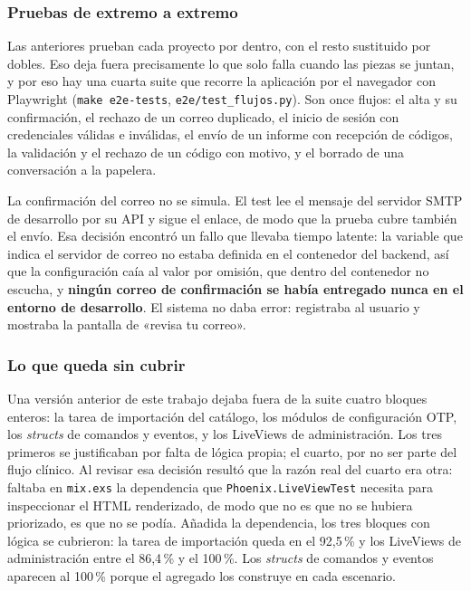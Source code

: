 \subsubsection*{Pruebas de extremo a extremo}

Las anteriores prueban cada proyecto por dentro, con el resto sustituido por dobles. Eso deja fuera precisamente lo que solo falla cuando las piezas se juntan, y por eso hay una cuarta suite que recorre la aplicación por el navegador con Playwright (\texttt{make e2e-tests}, \texttt{e2e/test\_flujos.py}). Son once flujos: el alta y su confirmación, el rechazo de un correo duplicado, el inicio de sesión con credenciales válidas e inválidas, el envío de un informe con recepción de códigos, la validación y el rechazo de un código con motivo, y el borrado de una conversación a la papelera.

La confirmación del correo no se simula. El test lee el mensaje del servidor SMTP de desarrollo por su API y sigue el enlace, de modo que la prueba cubre también el envío. Esa decisión encontró un fallo que llevaba tiempo latente: la variable que indica el servidor de correo no estaba definida en el contenedor del backend, así que la configuración caía al valor por omisión, que dentro del contenedor no escucha, y \textbf{ningún correo de confirmación se había entregado nunca en el entorno de desarrollo}. El sistema no daba error: registraba al usuario y mostraba la pantalla de «revisa tu correo».

\subsubsection*{Lo que queda sin cubrir}

Una versión anterior de este trabajo dejaba fuera de la suite cuatro bloques enteros: la tarea de importación del catálogo, los módulos de configuración OTP, los \emph{structs} de comandos y eventos, y los LiveViews de administración. Los tres primeros se justificaban por falta de lógica propia; el cuarto, por no ser parte del flujo clínico. Al revisar esa decisión resultó que la razón real del cuarto era otra: faltaba en \texttt{mix.exs} la dependencia que \texttt{Phoenix.LiveViewTest} necesita para inspeccionar el HTML renderizado, de modo que no es que no se hubiera priorizado, es que no se podía. Añadida la dependencia, los tres bloques con lógica se cubrieron: la tarea de importación queda en el 92,5\,\% y los LiveViews de administración entre el 86,4\,\% y el 100\,\%. Los \emph{structs} de comandos y eventos aparecen al 100\,\% porque el agregado los construye en cada escenario.

